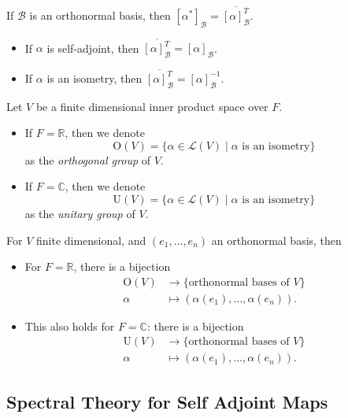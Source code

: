 \documentclass[12pt]{article}
\begin{document}
\begin{proofbox}
	If $\mathcal{B}$ is an orthonormal basis, then $[\alpha^{\ast}]_{\mathcal{B}} = \overline{[\alpha]_{\mathcal{B}}^{T}}$.
	\begin{itemize}
		\item If $\alpha$ is self-adjoint, then $\overline{[\alpha]_{\mathcal{B}}^{T}} = [\alpha]_{\mathcal{B}}$.
		\item If $\alpha$ is an isometry, then $\overline{[\alpha]_{\mathcal{B}}^{T}} = [\alpha]_{\mathcal{B}}^{-1}$.
	\end{itemize}
\end{proofbox}

\begin{definition}
	Let $V$ be a finite dimensional inner product space over $F$.
	\begin{itemize}
		\item If $F = \mathbb{R}$, then we denote
			\[
				\mathrm{O}(V) = \{\alpha \in \mathcal{L}(V) \mid \alpha \text{ is an isometry}\}
			\]
			as the \textit{orthogonal group} of $V$.
		\item If $F = \mathbb{C}$, then we denote
			\[
				\mathrm{U}(V) = \{ \alpha \in \mathcal{L}(V) \mid \alpha \text{ is an isometry}\}
			\]
			as the \textit{unitary group} of $V$.
	\end{itemize}
\end{definition}

\begin{remark}
	For $V$ finite dimensional, and $(e_1, \ldots, e_n)$ an orthonormal basis, then
	\begin{itemize}
		\item For $F = \mathbb{R}$, there is a bijection
			\begin{align*}
				\mathrm{O}(V) &\to \{\text{orthonormal bases of } V\} \\
				\alpha &\mapsto (\alpha(e_1), \ldots, \alpha(e_n)).
			\end{align*}
		\item This also holds for $F = \mathbb{C}$: there is a bijection
			\begin{align*}
				\mathrm{U}(V) &\to \{\text{orthonormal bases of } V\} \\
				\alpha &\mapsto (\alpha(e_1), \ldots, \alpha(e_n)).
			\end{align*}
	\end{itemize}
\end{remark}

\subsection{Spectral Theory for Self Adjoint Maps}
\label{sub:spectral_theory_for_self_adjoint_maps}
\end{document}

